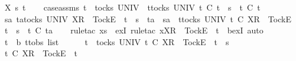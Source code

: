 \ X\ s\ t\isanewline
\ \ \isamarkupfalse%
\ case{\isacharunderscore}assms{\isacharcolon}\ {\isachardoublequoteopen}t\ {\isasymin}\ tocks\ UNIV{\isachardoublequoteclose}\ {\isachardoublequoteopen}\ {\isasymforall}t{\isacharprime}{\isasymin}tocks\ UNIV{\isachardot}\ t{\isacharprime}\ {\isasymle}\isactrlsub C\ t\ {\isacharat}\ s\ {\isasymlongrightarrow}\ t{\isacharprime}\ {\isasymle}\isactrlsub C\ t{\isachardoublequoteclose}\isanewline
\ \ \isamarkupfalse%
\ \isamarkupfalse%
\ {\isachardoublequoteopen}{\isasymexists}sa{\isachardot}\ {\isasymexists}ta{\isasymin}tocks\ UNIV{\isachardot}\ {\isacharbrackleft}X{\isacharbrackright}\isactrlsub R\ {\isacharhash}\ {\isacharbrackleft}Tock{\isacharbrackright}\isactrlsub E\ {\isacharhash}\ t\ {\isacharat}\ s\ {\isacharequal}\ ta\ {\isacharat}\ sa\ {\isasymand}\ {\isacharparenleft}{\isasymforall}t{\isacharprime}{\isasymin}tocks\ UNIV{\isachardot}\ t{\isacharprime}\ {\isasymle}\isactrlsub C\ {\isacharbrackleft}X{\isacharbrackright}\isactrlsub R\ {\isacharhash}\ {\isacharbrackleft}Tock{\isacharbrackright}\isactrlsub E\ {\isacharhash}\ t\ {\isacharat}\ s\ {\isasymlongrightarrow}\ t{\isacharprime}\ {\isasymle}\isactrlsub C\ ta{\isacharparenright}{\isachardoublequoteclose}\isanewline
\ \ \isamarkupfalse%
\ {\isacharparenleft}rule{\isacharunderscore}tac\ x{\isacharequal}{\isachardoublequoteopen}s{\isachardoublequoteclose}\ \ exI{\isacharcomma}\ rule{\isacharunderscore}tac\ x{\isacharequal}{\isachardoublequoteopen}{\isacharbrackleft}X{\isacharbrackright}\isactrlsub R\ {\isacharhash}\ {\isacharbrackleft}Tock{\isacharbrackright}\isactrlsub E\ {\isacharhash}\ t{\isachardoublequoteclose}\ \ bexI{\isacharcomma}\ auto{\isacharparenright}\isanewline
\ \ \ \ \isamarkupfalse%
\ t{\isacharprime}\ {\isacharcolon}{\isacharcolon}\ {\isachardoublequoteopen}{\isacharprime}b\ ttobs\ list{\isachardoublequoteclose}\isanewline
\ \ \ \ \isamarkupfalse%
\ {\isachardoublequoteopen}t{\isacharprime}\ {\isasymin}\ tocks\ UNIV{\isachardoublequoteclose}\ {\isachardoublequoteopen}t{\isacharprime}\ {\isasymle}\isactrlsub C\ {\isacharbrackleft}X{\isacharbrackright}\isactrlsub R\ {\isacharhash}\ {\isacharbrackleft}Tock{\isacharbrackright}\isactrlsub E\ {\isacharhash}\ t\ {\isacharat}\ s{\isachardoublequoteclose}\isanewline
\ \ \ \ \isamarkupfalse%
\ \isamarkupfalse%
\ {\isachardoublequoteopen}t{\isacharprime}\ {\isasymle}\isactrlsub C\ {\isacharbrackleft}X{\isacharbrackright}\isactrlsub R\ {\isacharhash}\ {\isacharbrackleft}Tock{\isacharbrackright}\isactrlsub E\ {\isacharhash}\ t{\isachardoublequoteclose}\isanewline
